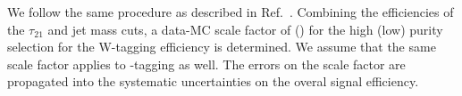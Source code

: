 We follow the same procedure as described in Ref.~\cite{JME-13-006}.
Combining the efficiencies of the $\tau_{21}$ and jet mass cuts, a data-MC scale factor of  \scalefactorHP
(\scalefactorLP) for the high (low) purity selection for the  W-tagging efficiency is determined.
We assume that the same scale factor applies to \zboson-tagging as well.
The errors on the scale factor are propagated
into the systematic uncertainties on the overal signal efficiency.





